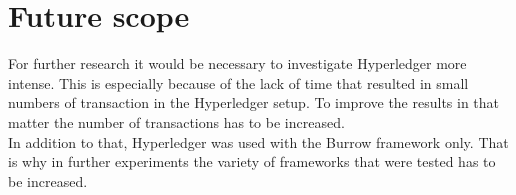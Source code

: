 \section{Future scope}
For further research it would be necessary to investigate Hyperledger more intense. This is especially because of the lack of time that resulted in small numbers of transaction in the Hyperledger setup. To improve the results in that matter the number of transactions has to be increased.
\\
In addition to that, Hyperledger was used with the Burrow framework only. That is why in further experiments the variety of frameworks that were tested has to be increased.